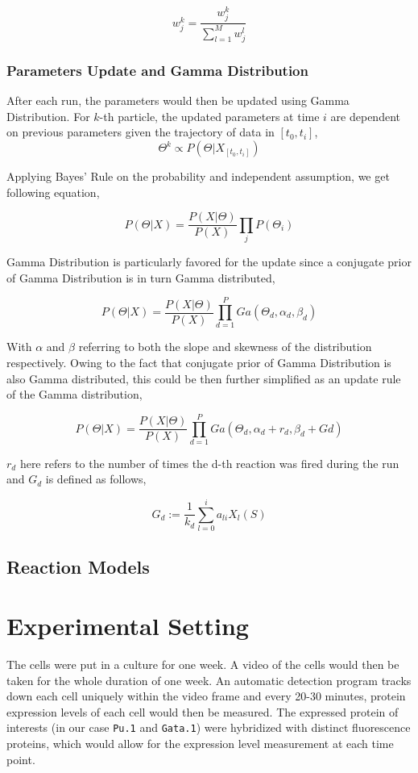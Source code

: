 \documentclass[12pt, oneside]{article}
\begin{document}
$$w_j^k = \frac{w_j^k}{\sum_{l=1}^{M} w_{j}^l}$$

\subsubsection{Parameters Update and Gamma Distribution}

After each run, the parameters would then be updated using Gamma Distribution. For $k$-th particle, the updated parameters at time $i$ are dependent on previous parameters given the trajectory of data in $[t_0, t_i]$,\\

$$\Theta^k \propto P(\Theta | X_{[t_0, t_i]})$$

Applying Bayes' Rule on the probability and independent assumption, we get following equation,

$$P(\Theta | X) = \frac{P(X | \Theta)}{P (X)} \prod_{j} P(\Theta_i)$$

Gamma Distribution is particularly favored for the update since a conjugate prior of Gamma Distribution is in turn Gamma distributed,

$$P(\Theta | X) = \frac{P(X | \Theta)}{P (X)} \prod_{d=1}^{P} Ga(\Theta_d, \alpha_d, \beta_d)$$

With $\alpha$ and $\beta$ referring to both the slope and skewness of the distribution respectively. Owing to the fact that conjugate prior of Gamma Distribution is also Gamma distributed, this could be then further simplified as an update rule of the Gamma distribution,

$$P(\Theta | X) = \frac{P(X | \Theta)}{P (X)} \prod_{d=1}^{P} Ga(\Theta_d, \alpha_d + r_d, \beta_d + Gd)$$

$r_d$ here refers to the number of times the d-th reaction was fired during the run and $G_d$ is defined as follows,

$$G_d := \frac{1}{k_d} \sum_{l=0}^{i} a_{li} X_l(S)$$


\subsection{Reaction Models}


\section{Experimental Setting}

The cells were put in a culture for one week. A video of the cells would then be taken for the whole duration of one week. An automatic detection program tracks down each cell uniquely within the video frame and every 20-30 minutes, protein expression levels of each cell would then be measured. The expressed protein of interests (in our case \texttt{Pu.1} and \texttt{Gata.1}) were hybridized with distinct fluorescence proteins, which would allow for the expression level measurement at each time point.
\end{document}
